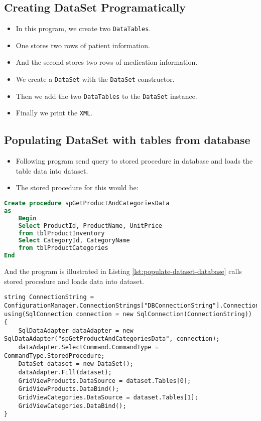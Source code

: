 \subsection*{Creating DataSet Programatically}
\begin{itemize}
	\item In this program, we create two \texttt{DataTables}. 
	\item One stores two rows of patient information. 
	\item And the second stores two rows of medication information.
	\item We create a \texttt{DataSet} with the \texttt{DataSet} constructor. 
	\item Then we add the two \texttt{DataTables} to the \texttt{DataSet} instance. 
	\item Finally we print the \texttt{XML}.
\end{itemize}






\subsection*{Populating DataSet with tables from database}
\begin{itemize}
	\item Following program send query to stored procedure in database and loads the table data into dataset. 
	\item The stored procedure for this would be:
\end{itemize}


\begin{lstlisting}[language=sql]
Create procedure spGetProductAndCategoriesData
as
	Begin
	Select ProductId, ProductName, UnitPrice
	from tblProductInventory
	Select CategoryId, CategoryName
	from tblProductCategories
End
\end{lstlisting}

And the program is illustrated in Listing \ref{lst:populate-dataset-database} calls stored procedure and loads data into dataset.

\begin{lstlisting}[caption={Loading data into DataSet using}, label={lst:populate-dataset-database}]
string ConnectionString = ConfigurationManager.ConnectionStrings["DBConnectionString"].ConnectionString;
using(SqlConnection connection = new SqlConnection(ConnectionString)) {
	SqlDataAdapter dataAdapter = new SqlDataAdapter("spGetProductAndCategoriesData", connection);
	dataAdapter.SelectCommand.CommandType = CommandType.StoredProcedure;
	DataSet dataset = new DataSet();
	dataAdapter.Fill(dataset);
	GridViewProducts.DataSource = dataset.Tables[0];
	GridViewProducts.DataBind();
	GridViewCategories.DataSource = dataset.Tables[1];
	GridViewCategories.DataBind();
}
\end{lstlisting}

